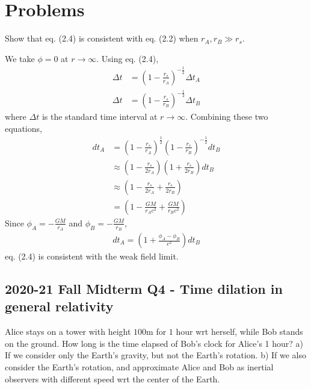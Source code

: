 \documentclass[12pt]{book} %
\numberwithin{equation}{chapter}
\def\D{\Delta}
\begin{document}
\section*{Problems}
\begin{problem}
Show that eq. (2.4) is consistent with eq. (2.2) when $r_{A}, r_{B}\gg r_{s}$.
\end{problem}
\begin{solbox}
We take $\phi=0$ at $r\to\infty$. Using eq. (2.4),
\begin{align*}
\D t&={\left(1-\frac{r_{s}}{r_{A}}\right)}^{-\frac{1}{2}}\D t_{A}\\
\D t&={\left(1-\frac{r_{s}}{r_{B}}\right)}^{-\frac{1}{2}}\D t_{B}
\end{align*}
where $\D t$ is the standard time interval at $r\to\infty$. Combining these two equations,
\begin{align*}
dt_{A}&={\left(1-\frac{r_{s}}{r_{A}}\right)}^{\frac{1}{2}}{\left(1-\frac{r_{s}}{r_{B}}\right)}^{-\frac{1}{2}}dt_{B}\\
&\approx \left(1-\frac{r_{s}}{2r_{A}}\right)\left(1+\frac{r_{s}}{2r_{B}}\right)dt_{B}\\
&\approx \left(1-\frac{r_{s}}{2r_{A}}+\frac{r_{s}}{2r_{B}}\right)\\
&=\left(1-\frac{GM}{r_{A}c^2}+\frac{GM}{r_{B}c^2}\right)
\end{align*}
Since $\phi_{A}= -\frac{GM}{r_{A}}$ and $\phi_{B}= -\frac{GM}{r_{B}}$,
\begin{align*}
dt_{A}=\left(1+\frac{\phi_{A}-\phi_{B}}{c^2}\right)dt_{B}
\end{align*}
eq. (2.4) is consistent with the weak field limit.
\end{solbox}

\subsection*{2020-21 Fall Midterm Q4 - Time dilation in general relativity}
Alice stays on a tower with height $100\text{m}$ for $1$ hour wrt herself, while Bob stands on the ground. How long is the time elapsed of Bob's clock for Alice's 1 hour?\bigskip\newline
a) If we consider only the Earth's gravity, but not the Earth's rotation.\bigskip\newline
b) If we also consider the Earth's rotation, and approximate Alice and Bob as inertial observers with different speed wrt the center of the Earth.
\end{document}
